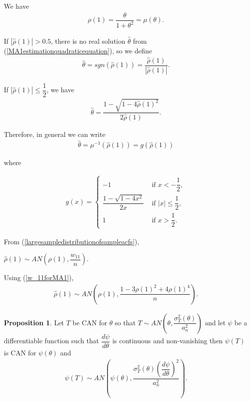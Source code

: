 \documentclass[11pt, a4paper]{article}
\numberwithin{equation}{section}
\theoremstyle{definition}
\newtheorem{proposition}{Proposition}[section]
\begin{document}
We have
\begin{align}\label{rho1asafunctionoftheta}
\rho(1) = \dfrac{\theta}{1 + \theta^2} = \mu(\theta).
\end{align}

If $|\hat{\rho}(1)| > 0.5$, there is no real solution $\hat{\theta}$ from (\ref{MA1estimationquadraticequation}), so we define
\begin{align*}
\hat{\theta} = sgn(\hat{\rho}(1)) = \dfrac{\hat{\rho}(1)}{|\hat{\rho}(1)|}.
\end{align*}

If $|\hat{\rho}(1)| \leq \dfrac{1}{2}$, we have
\begin{align*}
\hat{\theta} = \dfrac{1 - \sqrt{1 - 4\hat{\rho}(1)^2}}{2\hat{\rho}(1)}.
\end{align*}

Therefore, in general we can write
\begin{align}\label{thetahatintermsofmuinverse}
\hat{\theta} = \mu^{-1}(\hat{\rho}(1)) = g(\hat{\rho}(1))
\end{align}

where

\begin{align*}
g(x) = \begin{cases}
-1 &\text{ if } x < -\dfrac{1}{2}, \\[0.5em]
\dfrac{1 - \sqrt{1 - 4x^2}}{2x} &\text{ if } |x| \leq \dfrac{1}{2}, \\[0.5em]
1 &\text{ if } x > \dfrac{1}{2}.
\end{cases}
\end{align*}

From (\ref{largesampledistributionofsampleacfs}), 
\begin{center}
$\hat{\rho}(1) \sim AN\left( \rho(1), \dfrac{w_{11}}{n} \right)$.
\end{center}

Using (\ref{w_11forMA1}),
\begin{align}\label{asymptoticrho1hatforma1}
\hat{\rho}(1) \sim AN\left( \rho(1), \dfrac{1 - 3\rho(1)^2 + 4\rho(1)^4}{n} \right).
\end{align}

\begin{proposition}\label{InvariancePropertyofCANEstimators} Let $T$ be CAN for $\theta$ so that $T \sim AN\left( \theta, \dfrac{\sigma_T^2(\theta)}{a_n^2} \right)$ and let $\psi$ be a differentiable function such that $\dfrac{d\psi}{d\theta}$ is continuous and non-vanishing then $\psi(T)$ is CAN for $\psi(\theta)$ and
\begin{align*}
\psi(T) \sim AN\left( \psi(\theta), \dfrac{\sigma_T^2 (\theta) \left( \dfrac{d\psi}{d\theta} \right)^2}{a_n^2} \right).
\end{align*}
\end{proposition}
\end{document}
